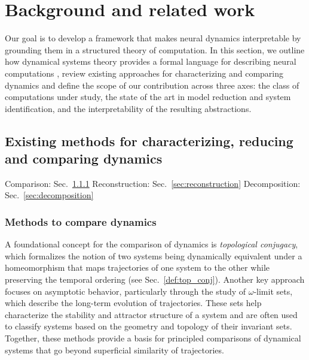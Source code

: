\documentclass{article}
\theoremstyle{definition} \newtheorem{definition}{Definition}  \newtheorem{example}{Example}
\theoremstyle{remark} \newtheorem{remark}{Remark}
\newcounter{ct}
\begin{document}
\section{Background and related work}\label{sec:background}
Our goal is to develop a framework that makes neural dynamics interpretable by grounding them in a structured theory of computation.
In this section, we outline how dynamical systems theory provides a formal language for describing neural computations \citep{jaeger2021theory, jaeger2023timescales, elgazzar2024universal}, review existing approaches for characterizing and comparing dynamics %
and define the scope of our contribution across three axes: the class of computations under study, the state of the art in model reduction and system identification, and the interpretability of the resulting abstractions.




\subsection{Existing methods for characterizing, reducing and comparing dynamics}\label{sec:sota_methods}
Comparison: Sec.~\ref{sec:comparison}
Reconstruction: Sec.~\ref{sec:reconstruction}
Decomposition: Sec.~\ref{sec:decomposition}


\subsubsection{Methods to compare dynamics}\label{sec:comparison}
A foundational concept for the comparison of dynamics is \emph{topological conjugacy}, which formalizes the notion of two systems being dynamically equivalent under a homeomorphism that maps trajectories of one system to the other while preserving the temporal ordering (see Sec.~\ref{def:top_conj}).
Another key approach focuses on asymptotic behavior, particularly through the study of $\omega$-limit sets, which describe the long-term evolution of trajectories.
These sets help characterize the stability and attractor structure of a system and are often used to classify systems based on the geometry and topology of their invariant sets\citep{Jordan2019a}.
Together, these methods provide a basis for principled comparisons of dynamical systems that go beyond superficial similarity of trajectories.
\end{document}
